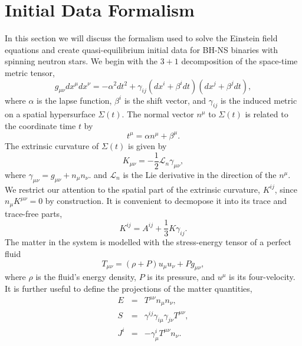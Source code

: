 \section{Initial Data Formalism}
\label{sec:Bh-NSIDF}
In this section we will discuss the formalism used to solve the
Einstein field equations and create quasi-equilibrium initial data for
BH-NS binaries with spinning neutron
stars. We begin with the $3+1$ decomposition of the space-time metric
tensor,
\begin{equation}
g_{\mu\nu}dx^{\mu}dx^{\nu} = -\alpha^2dt^2 + \gamma_{ij}\left(dx^i +
  \beta^idt\right)\left(dx^j+\beta^jdt\right),
\end{equation}
where $\alpha$ is the lapse function, $\beta^i$ is the shift vector,
and $\gamma_{ij}$ is the induced metric on a spatial hypersurface
$\Sigma(t)$. The normal vector $n^{\mu}$ to $\Sigma(t)$ is related to
the coordinate time $t$ by
\begin{equation}
t^{\mu} = \alpha n^{\mu} + \beta^{\mu}.
\end{equation}
The extrinsic curvature of $\Sigma(t)$ is given by
\begin{equation}
K_{\mu\nu} = -\frac{1}{2}\mathcal{L}_n\gamma_{\mu\nu},
\end{equation}
where $\gamma_{\mu\nu}=g_{\mu\nu}+n_{\mu}n_{\nu}.$ and $\mathcal{L}_n$
is the Lie derivative in the direction of the $n^{\mu}$. We restrict our
attention to the spatial part of the extrinsic curvature, $K^{ij}$,
since $n_{\mu}K^{\mu\nu}=0$ by construction. It is convenient to
decmopose it into its trace and trace-free parts,
\begin{equation}
K^{ij} = A^{ij}+\frac{1}{3}K\gamma_{ij}.
\end{equation}
The matter in the system is modelled with the stress-energy tensor of
a perfect fluid 
\begin{equation}
T_{\mu\nu}=\left(\rho+P\right)u_{\mu}u_{\nu}+Pg_{\mu\nu},
\end{equation}
where $\rho$ is the fluid's energy density, $P$ is its pressure, and
$u^{\mu}$ is its four-velocity. It is further useful to define the
projections of the matter quantities,
\begin{eqnarray}
E &=& T^{\mu\nu}n_{\mu}n_{\nu},\\
S &=& \gamma^{ij}\gamma_{i\mu}\gamma_{j\nu}T^{\mu\nu}, \\
J^i &=& -\gamma^{i}_{\mu}T^{\mu\nu}n_{\nu}.
\end{eqnarray}
